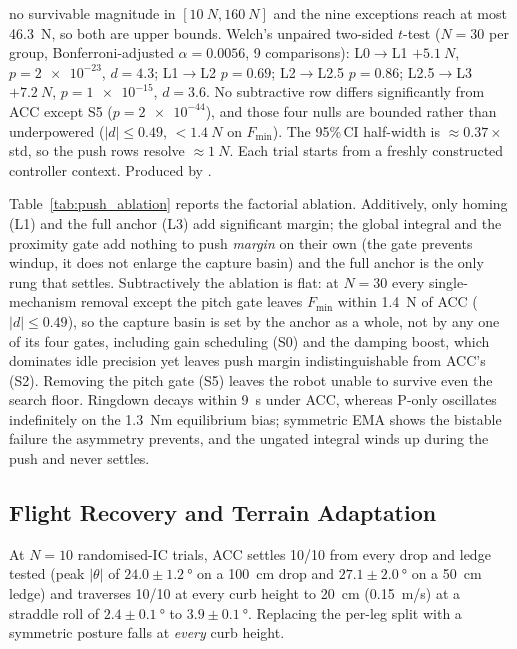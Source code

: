 \documentclass{jcd}
\begin{document}
\begin{table}[htbp]
no survivable magnitude in $[\SI{10}{N},\SI{160}{N}]$ and the nine exceptions
reach at most \SI{46.3}{N}, so both are upper bounds. Welch's unpaired two-sided
$t$-test ($N{=}30$ per group, Bonferroni-adjusted $\alpha{=}0.0056$, \num{9}
comparisons): L0$\rightarrow$L1 $+\SI{5.1}{N}$, $p{=}\num{2e-23}$, $d{=}4.3$;
L1$\rightarrow$L2 $p{=}0.69$; L2$\rightarrow$L2.5 $p{=}0.86$;
L2.5$\rightarrow$L3 $+\SI{7.2}{N}$, $p{=}\num{1e-15}$, $d{=}3.6$. No subtractive
row differs significantly from ACC except S5 ($p{=}\num{2e-44}$), and those four
nulls are bounded rather than underpowered ($|d|{\le}0.49$, ${<}\SI{1.4}{N}$ on
$F_{\min}$). The 95\%\,CI half-width is ${\approx}0.37{\times}$std, so the push
rows resolve ${\approx}\SI{1}{N}$. Each trial starts from a freshly constructed
controller context. Produced by .
\end{table}

Table~\ref{tab:push_ablation} reports the factorial ablation. Additively, only
homing (L1) and the full anchor (L3) add significant margin; the global integral
and the proximity gate add nothing to push \emph{margin} on their own (the gate prevents windup, it does not enlarge the capture basin) and the full anchor is
the only rung that settles. Subtractively the ablation is flat: at $N{=}30$ every
single-mechanism removal except the pitch gate leaves $F_{\min}$ within
\SI{1.4}{N} of ACC ($|d|{\le}0.49$), so the capture basin is set by the anchor as
a whole, not by any one of its four gates, including gain scheduling (S0) and
the damping boost, which dominates idle precision yet leaves push margin
indistinguishable from ACC's (S2). Removing the pitch gate (S5) leaves the robot
unable to survive even the search floor. Ringdown decays within \SI{9}{s} under
ACC, whereas P-only oscillates indefinitely on the \SI{1.3}{Nm} equilibrium bias;
symmetric EMA shows the bistable failure the asymmetry prevents, and the ungated
integral winds up during the push and never settles.

\subsection{Flight Recovery and Terrain Adaptation}
\label{sec:flight_terrain_results}

At $N{=}10$ randomised-IC trials, ACC settles \num{10}/\num{10} from every drop and ledge tested (peak $|\theta|$ of $24.0{\pm}\SI{1.2}{\degree}$ on a
\SI{100}{cm} drop and $27.1{\pm}\SI{2.0}{\degree}$ on a \SI{50}{cm} ledge) and traverses \num{10}/\num{10} at every curb height to \SI{20}{cm}
(\SI{0.15}{m/s}) at a straddle roll of $2.4{\pm}\SI{0.1}{\degree}$ to
$3.9{\pm}\SI{0.1}{\degree}$. Replacing the per-leg split with a symmetric
posture falls at \emph{every} curb height.
\end{document}
